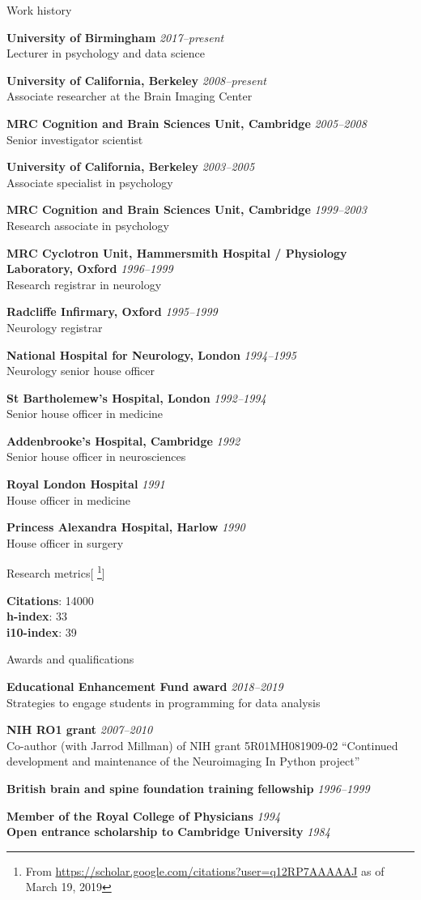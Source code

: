 \documentclass{cv}
\newcommand{\PlaceDateNote}[3]{{\bf #1} \hfill {\em #2} \\#3}
\newcommand{\UCB}{University of California, Berkeley}
\newcommand{\UoB}{University of Birmingham}
\newcommand{\CBU}{MRC Cognition and Brain Sciences Unit, Cambridge}
\begin{document}
\begin{cvSection}{Work history}

\PlaceDateNote{\UoB}{2017--present }{
Lecturer in psychology and data science}

\PlaceDateNote{\UCB}{2008--present }{
Associate researcher at the Brain Imaging Center}

\PlaceDateNote{\CBU}{2005--2008}{
Senior investigator scientist}

\PlaceDateNote{\UCB}{2003--2005 }{
    Associate specialist in psychology}

\PlaceDateNote{\CBU}{1999--2003 }{
    Research associate in psychology}

\PlaceDateNote{
MRC Cyclotron Unit, Hammersmith Hospital / Physiology Laboratory, Oxford}
{1996--1999}
    {Research registrar in neurology}

\PlaceDateNote{Radcliffe Infirmary, Oxford}
{1995--1999}
{Neurology registrar}

\PlaceDateNote{National Hospital for Neurology, London}{1994--1995 }{
Neurology senior house officer}

\PlaceDateNote{St Bartholemew's Hospital, London}{1992--1994 }{
Senior house officer in medicine}

\PlaceDateNote{Addenbrooke's Hospital, Cambridge}{1992 }{
Senior house officer in neurosciences}

\PlaceDateNote{Royal London Hospital}{1991 }{
House officer in medicine}

\PlaceDateNote{Princess Alexandra Hospital, Harlow}{1990 }{
House officer in surgery}

\end{cvSection}

\begin{cvSection}{Research metrics}[
    \footnote{ From
    \url{https://scholar.google.com/citations?user=q12RP7AAAAAJ} as of March
    19, 2019}]

{\bf Citations}: 14000 \\
{\bf h-index}: 33 \\
{\bf i10-index}: 39

\end{cvSection}

\begin{cvSection}{Awards and qualifications}

\PlaceDateNote{Educational Enhancement Fund award}{2018--2019}
{Strategies to engage students in programming for data analysis
}

\PlaceDateNote{NIH RO1 grant}{2007--2010}
{Co-author (with Jarrod Millman) of NIH grant 5R01MH081909-02 ``Continued
development and maintenance of the Neuroimaging In Python project''}

{\bf British brain and spine foundation training fellowship} \hfill {\em
1996--1999}

\PlaceDateNote{Member of the Royal College of Physicians}{1994}{}

\PlaceDateNote{Open entrance scholarship to Cambridge University}{1984}{}

\end{cvSection}
\end{document}
